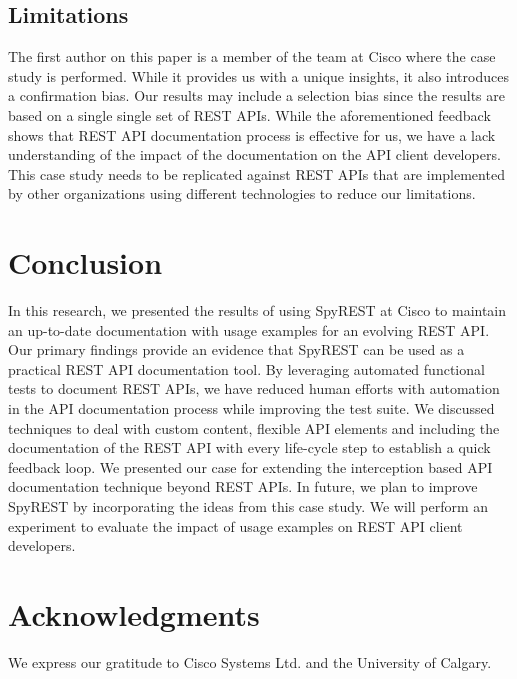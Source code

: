 \subsection{Limitations} %

The first author on this paper is a member of the team at Cisco where the case study is performed. While it provides us with a unique insights, it also introduces a confirmation bias. Our results may include a selection bias since the results are based on a single single set of REST APIs. While the aforementioned feedback shows that REST API documentation process is effective for us, we have a lack understanding of the impact of the documentation on the API client developers. This case study needs to be replicated against REST APIs that are implemented by other organizations using different technologies to reduce our limitations.

\section{Conclusion}
In this research, we presented the results of using SpyREST at Cisco to maintain an up-to-date documentation with usage examples for an evolving REST API. Our primary findings provide an evidence that SpyREST can be used as a practical REST API documentation tool. By leveraging automated functional tests to document REST APIs, we have reduced human efforts with automation in the API documentation process while improving the test suite. We discussed techniques to deal with custom content, flexible API elements and including the documentation of the REST API with every life-cycle step to establish a quick feedback loop. We presented our case for extending the interception based API documentation technique beyond REST APIs. In future, we plan to improve SpyREST by incorporating the ideas from this case study. We will perform an experiment to evaluate the impact of usage examples on REST API client developers.

\section*{Acknowledgments}
\footnotesize
We express our gratitude to Cisco Systems Ltd. and the University of Calgary.
\normalsize




